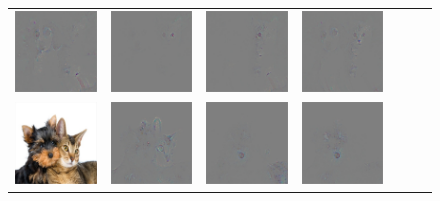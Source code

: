 \begin{figure}
\begin{center}
\begin{tabular}{ccccccc}
\includegraphics[width=0.13\linewidth]{figs/class_compare/googlenet/soft/dog-cat2_diff_188} &
\includegraphics[width=0.13\linewidth]{figs/class_compare/googlenet/soft/dog-cat2_diff_279} &
\includegraphics[width=0.13\linewidth]{figs/class_compare/googlenet/soft/dog-cat2_diff_293} &
\includegraphics[width=0.13\linewidth]{figs/class_compare/googlenet/soft/dog-cat2_diff_10} \\
\includegraphics[width=0.13\linewidth]{figs/class_compare/googlenet/soft/dog-cat3} &
\includegraphics[width=0.13\linewidth]{figs/class_compare/googlenet/soft/dog-cat3_diff_258} &
\includegraphics[width=0.13\linewidth]{figs/class_compare/googlenet/soft/dog-cat3_diff_163} &
\includegraphics[width=0.13\linewidth]{figs/class_compare/googlenet/soft/dog-cat3_diff_188} &

\end{tabular}
\end{center}
\end{figure}
